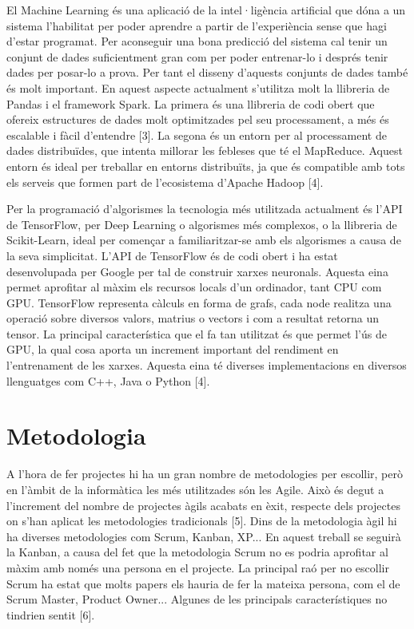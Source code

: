 \documentclass[10pt,a4paper,twocolumn,twoside]{article}
\begin{document}
El Machine Learning és una aplicació de la intel·ligència artificial que dóna a un sistema l'habilitat per poder aprendre a partir de l'experiència sense que hagi d'estar programat. Per aconseguir una bona predicció del sistema cal tenir un conjunt de dades suficientment gran com per poder entrenar-lo i després tenir dades per posar-lo a prova. Per tant el disseny d'aquests conjunts de dades també és molt important. En aquest aspecte actualment s'utilitza molt la llibreria de Pandas i el framework Spark. La primera és una llibreria de codi obert que ofereix estructures de dades molt optimitzades pel seu processament, a més és escalable i fàcil d'entendre [3]. La segona és un entorn per al processament de dades distribuïdes, que intenta millorar les febleses que té el MapReduce. Aquest entorn és ideal per treballar en entorns distribuïts, ja que és compatible amb tots els serveis que formen part de l'ecosistema d'Apache Hadoop [4].

Per la programació d'algorismes la tecnologia més utilitzada actualment és l'API de TensorFlow, per Deep Learning o algorismes més complexos, o la llibreria de Scikit-Learn, ideal per començar a familiaritzar-se amb els algorismes a causa de la seva simplicitat. L'API de TensorFlow és de codi obert i ha estat desenvolupada per Google per tal de construir xarxes neuronals. Aquesta eina permet aprofitar al màxim els recursos locals d'un ordinador, tant CPU com GPU. TensorFlow representa càlculs en forma de grafs, cada node realitza una operació sobre diversos valors, matrius o vectors i com a resultat retorna un tensor. La principal característica que el fa tan utilitzat és que permet l'ús de GPU, la qual cosa aporta un increment important del rendiment en l'entrenament de les xarxes. Aquesta eina té diverses implementacions en diversos llenguatges com C++, Java o Python [4].
\section {Metodologia}
A l'hora de fer projectes hi ha un gran nombre de metodologies per escollir, però en l'àmbit de la informàtica les més utilitzades són les Agile. Això és degut a l'increment del nombre de projectes àgils acabats en èxit, respecte dels projectes on s'han aplicat les metodologies tradicionals [5]. Dins de la metodologia àgil hi ha diverses metodologies com Scrum, Kanban, XP... En aquest treball se seguirà la Kanban, a causa del fet que la metodologia Scrum no es podria aprofitar al màxim amb només una persona en el projecte. La principal raó per no escollir Scrum ha estat que molts papers els hauria de fer la mateixa persona, com el de Scrum Master, Product Owner... Algunes de les principals característiques no tindrien sentit [6].
\end{document}
